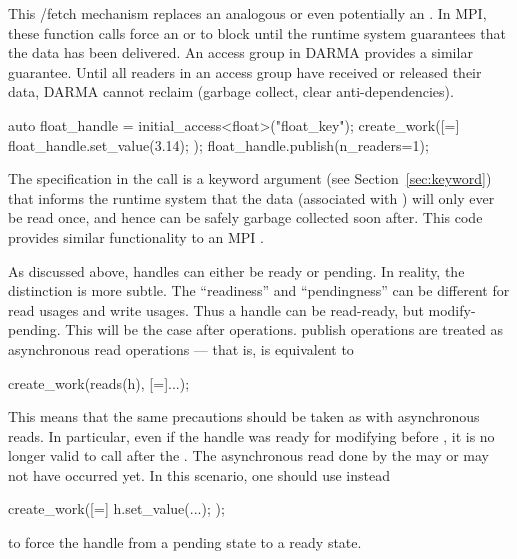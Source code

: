 This /\gls{fetch} mechanism replaces an analogous
 or even  potentially an .
In MPI, these function calls force an  or
 to block until the \gls{runtime system} guarantees that the data has been delivered.
An \gls{access group} in \gls{DARMA} provides a similar guarantee.
Until all readers in an \gls{access group} have received or released their
data, \gls{DARMA} cannot reclaim (garbage collect, clear anti-dependencies).

\begin{CppCode}
auto float_handle = initial_access<float>("float_key");
create_work([=]{
  float_handle.set_value(3.14);
});
float_handle.publish(n_readers=1);
\end{CppCode}
The  specification in the  call is a
\gls{keyword argument} (see Section~\ref{sec:keyword}) that informs the
\gls{runtime system} that the data
(associated with ) will only ever be read once, and hence can be safely garbage collected soon after.  
This code provides similar functionality to an MPI .

As discussed above, \glspl{handle} can either be \gls{ready} or \gls{pending}. 
In reality, the distinction is more subtle. 
The ``readiness'' and ``pendingness'' can be different for read usages and write usages.
Thus a handle can be read-ready, but modify-pending.
This will be the case after  operations.
\Gls{publish} operations are treated as asynchronous read operations --- that is,
 is equivalent to
\begin{CppCode}
create_work(reads(h), [=]{...});  
\end{CppCode}
This means that the same precautions should be taken as with asynchronous reads. 
In particular, even if the handle was ready for modifying before
, it is no longer valid to call 
after the .
The asynchronous read done by the  may or may not have occurred yet.  
In this scenario, one should use instead
\begin{CppCode}
create_work([=]{ h.set_value(...); });
\end{CppCode}
to force the \gls{handle} from a \gls{pending} state to a \gls{ready} state.

